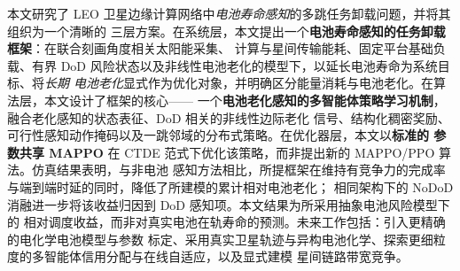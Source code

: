\documentclass[a4paper,11pt]{article}
\begin{document}
本文研究了 LEO 卫星边缘计算网络中\emph{电池寿命感知}的多跳任务卸载问题，并将其组织为一个清晰的
三层方案。在系统层，本文提出一个\textbf{电池寿命感知的任务卸载框架}：在联合刻画角度相关太阳能采集、
计算与星间传输能耗、固定平台基础负载、有界 DoD 风险状态以及非线性电池老化的模型下，以延长电池寿命为系统目标、将\emph{长期
电池老化}显式作为优化对象，并明确区分能量消耗与电池老化。在算法层，本文设计了框架的核心——
一个\textbf{电池老化感知的多智能体策略学习机制}，融合老化感知的状态表征、DoD 相关的非线性边际老化
信号、结构化稠密奖励、可行性感知动作掩码以及一跳邻域的分布式策略。在优化器层，本文以\textbf{标准的
参数共享 MAPPO} 在 CTDE 范式下优化该策略，而非提出新的 MAPPO/PPO 算法。仿真结果表明，与非电池
感知方法相比，所提框架在维持有竞争力的完成率与端到端时延的同时，降低了所建模的累计相对电池老化；
相同架构下的 NoDoD 消融进一步将该收益归因到 DoD 感知项。本文结果为所采用抽象电池风险模型下的
相对调度收益，而非对真实电池在轨寿命的预测。未来工作包括：引入更精确的电化学电池模型与参数
标定、采用真实卫星轨迹与异构电池化学、探索更细粒度的多智能体信用分配与在线自适应，以及显式建模
星间链路带宽竞争。
\end{document}
